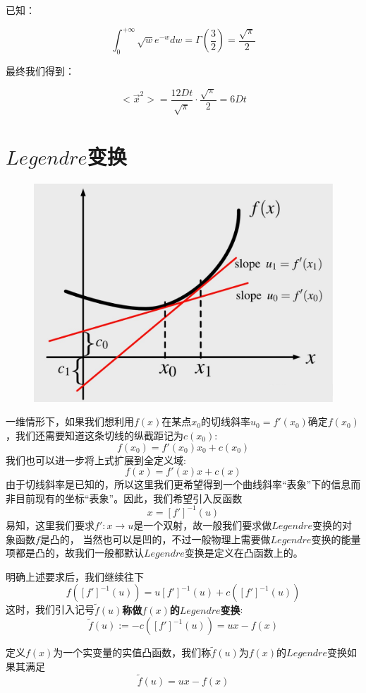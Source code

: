 已知：

\[\int_{0}^{+\infty}\sqrt{w}e^{-w}dw=\Gamma(\frac{3}{2})=\frac{\sqrt{\pi}}{2}\]

最终我们得到：

\[<\vec{x}^2>=\frac{12Dt}{\sqrt{\pi}} \cdot \frac{\sqrt{\pi}}{2}=6Dt \tag{*}\]

\section{$Legendre$变换}

\begin{figure}[htbp]
    \centering
    \includegraphics[scale=0.2]{./fig/Legendre Transform/1.png}
\end{figure}

一维情形下，如果我们想利用$f(x)$在某点$x_0$的切线斜率$u_0=f'(x_0)$确定$f(x_0)$，我们还需要知道这条切线的纵截距记为$c(x_0)$:
\[f(x_0)=f'(x_0)x_0+c(x_0)\]
我们也可以进一步将上式扩展到全定义域:
\[f(x)=f'(x)x+c(x)\]
由于切线斜率是已知的，所以这里我们更希望得到一个曲线斜率“表象”下的信息而非目前现有的坐标“表象”。因此，我们希望引入反函数
\[x=[f']^{-1}(u)\]
易知，这里我们要求$f':x \rightarrow u$是一个双射，故一般我们要求做$Legendre$变换的对象函数$f$是凸的，
当然也可以是凹的，不过一般物理上需要做$Legendre$变换的能量项都是凸的，故我们一般都默认$Legendre$变换是定义在凸函数上的。

明确上述要求后，我们继续往下
\[f([f']^{-1}(u))=u[f']^{-1}(u)+c([f']^{-1}(u))\]
这时，我们引入记号$\tilde{f}(u)$\textbf{称做$f(x)$的$Legendre$变换}:
\[\tilde{f}(u):=-c([f']^{-1}(u))=ux-f(x)\]

\begin{definition}[一维$Legendre$变换]
    定义$f(x)$为一个实变量的实值凸函数，我们称$\tilde{f}(u)$为$f(x)$的$Legendre$变换如果其满足
    \[\tilde{f}(u)=ux-f(x)\]
\end{definition}

